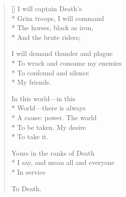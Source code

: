 \label{ch:lear_bb}
\settowidth{\versewidth}{I say,   and mean all and everyone}
\begin{verse}[\versewidth]
 I will captain Death's\\*
Grim troops, I will command\\*
The horses, black as iron,\\*
And the brute riders;

I will demand thunder and plague\\*
To wrack and consume my enemies\\*
To confound and silence\\*
My friends.

\qquad In this world---in this\\*
World---there is always\\*
A cause: power.   The world\\*
To be taken.   My desire\\*
To take it.

Yours in the ranks of Death\\*
I say,   and mean all and everyone\\*
In service

To Death.
\end{verse}
